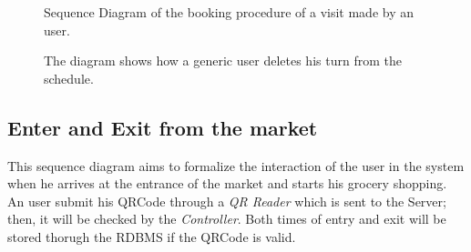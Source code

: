\begin{figure}[H]
  \label{VisitSD}
  \centering
    \caption{Sequence Diagram of the booking procedure of a visit made by an user.}
\end{figure} 




\begin{figure}[H]
  \label{DeleteVisitSD}
  \centering
    \caption{The diagram shows how a generic user deletes his turn from the schedule.}
\end{figure} 


\subsection{Enter and Exit from the market}
This sequence diagram aims to formalize the interaction of the user in the system when he arrives at the entrance of the market and starts his grocery shopping.
An user submit his QRCode through a \textit{QR Reader} which is sent to the Server; then, it will be checked by the \textit{Controller}. Both times of entry and exit will be stored thorugh the RDBMS if the QRCode is valid.

